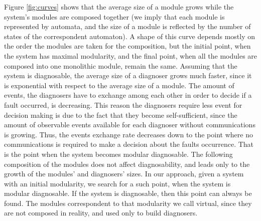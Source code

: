 \documentclass[a4paper, 10pt, conference]{ieeeconf}
\begin{document}
Figure \ref{fig:curves} shows that the average size of a module grows while the
system's modules are composed together (we imply that each module is represented
by automata, and the size of a module is reflected by the number of states of
the correspondent automaton).
A shape of this curve depends mostly on the order the modules are taken for the
composition, but the initial point, when the system has maximal modularity, and
the final point, when all the modules are composed into one monolithic module,
remain the same. Assuming that the system is diagnosable, the average size of a
diagnoser grows much faster, since it is exponential with respect to the average
size of a module.
The amount of events, the diagnosers have to exchange among each other in order
to decide if a fault occurred, is decreasing. This reason the diagnosers require
less event for decision making is due to the fact that they become
self-sufficient, since the amount of observable events available for each
diagnoser without communications is growing. Thus, the events exchange rate
decreases down to the point where no communications is required to make a
decision about the faults occurrence. That is the point when the system becomes
modular diagnosable. The following composition of the modules does not affect
diagnosability, and leads only to the growth of the modules' and diagnosers'
sizes. In our approach, given a system with an initial modularity, we search for
a such point, when the system is modular diagnosable. If the system is
diagnosable, then this point can always be found. The modules correspondent to
that modularity we call virtual, since they are not composed in reality, and
used only to build diagnosers.
\end{document}
